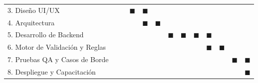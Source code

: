 \documentclass[12pt,a4paper]{article}
\begin{document}
\begin{table}[H]
{\begin{tabular}{@{} l *{12}{c} @{}}
            3. Diseño UI/UX                                       &                                                             &                        & $\blacksquare$         & $\blacksquare$         &                        &                        &                        &                        &                        &                        &                        &                        \\
            4. Arquitectura                                       &                                                             &                        &                        & $\blacksquare$         & $\blacksquare$         &                        &                        &                        &                        &                        &                        &                        \\
            5. Desarrollo de Backend                              &                                                             &                        &                        &                        &                        & $\blacksquare$         & $\blacksquare$         & $\blacksquare$         & $\blacksquare$         &                        &                        &                        \\
            6. Motor de Validación y Reglas                       &                                                             &                        &                        &                        &                        &                        &                        &                        & $\blacksquare$         & $\blacksquare$         &                        &                        \\
            7. Pruebas QA y Casos de Borde                        &                                                             &                        &                        &                        &                        &                        &                        &                        &                        &                        & $\blacksquare$         & $\blacksquare$         \\
            8. Despliegue y Capacitación                          &                                                             &                        &                        &                        &                        &                        &                        &                        &                        &                        &                        & $\blacksquare$         \\
            \bottomrule
        \end{tabular}%
    }
\end{table}
\end{document}

